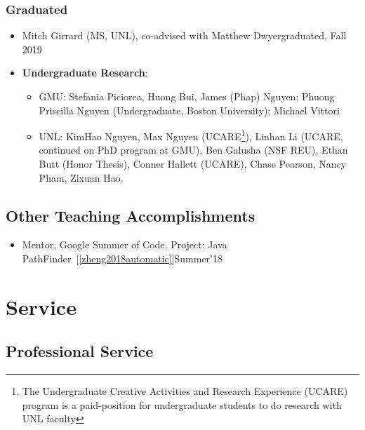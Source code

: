 \documentclass[11pt]{article}
\begin{document}
\subsubsection{Graduated}
\begin{itemize}
    \kimhao{}
    \guolong{}
    \alex{}
    \item Mitch Girrard (MS, UNL), co-advised with Matthew Dwyer\hfill graduated, Fall 2019
    
    \item \textbf{Undergraduate Research}:
    \begin{itemize}
        \item GMU: Stefania Piciorea, Huong Bui, James (Phap) Nguyen; Phuong Priscilla Nguyen (Undergraduate, Boston University); Michael Vittori
        \item UNL: KimHao Nguyen, Max Nguyen (UCARE\footnote{The Undergraduate Creative Activities and Research Experience (UCARE) program is a paid-position for undergraduate students to do research with UNL faculty}), Linhan Li (UCARE, continued on PhD program at GMU), Ben Galusha (NSF REU), Ethan Butt (Honor Thesis), Conner Hallett (UCARE), Chase Pearson, Nancy Pham, Zixuan Hao.
    \end{itemize}
\end{itemize}


\subsection{Other Teaching Accomplishments}
\begin{itemize}
    \item Mentor, Google Summer of Code, Project: Java PathFinder~[\ref{zheng2018automatic}]\hfill Summer'18
\end{itemize}

\section{Service}
\subsection{Professional Service}
\end{document}
